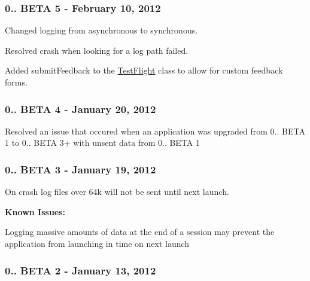 \subsubsection*{0.. B\-E\-T\-A 5 -\/ February 10, 2012}


\begin{DoxyItemize}
\item Changed logging from asynchronous to synchronous.
\item Resolved crash when looking for a log path failed.
\item Added submit\-Feedback to the \hyperlink{interface_test_flight}{Test\-Flight} class to allow for custom feedback forms.
\end{DoxyItemize}

\subsubsection*{0.. B\-E\-T\-A 4 -\/ January 20, 2012}


\begin{DoxyItemize}
\item Resolved an issue that occured when an application was upgraded from 0.. B\-E\-T\-A 1 to 0.. B\-E\-T\-A 3+ with unsent data from 0.. B\-E\-T\-A 1
\end{DoxyItemize}

\subsubsection*{0.. B\-E\-T\-A 3 -\/ January 19, 2012}


\begin{DoxyItemize}
\item On crash log files over 64k will not be sent until next launch.
\end{DoxyItemize}

{\bfseries Known Issues\-:}


\begin{DoxyItemize}
\item Logging massive amounts of data at the end of a session may prevent the application from launching in time on next launch
\end{DoxyItemize}

\subsubsection*{0.. B\-E\-T\-A 2 -\/ January 13, 2012}


